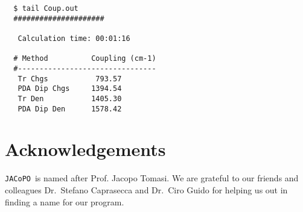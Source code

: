\documentclass[a4paper]{article}
\newcommand{\jacopo}{\texttt{JACoPO}}
\begin{document}
\begin{verbatim}
  $ tail Coup.out
  #####################

   Calculation time: 00:01:16
  
  # Method          Coupling (cm-1)
  #--------------------------------
   Tr Chgs           793.57 
   PDA Dip Chgs     1394.54 
   Tr Den           1405.30 
   PDA Dip Den      1578.42  
\end{verbatim}

\section*{Acknowledgements}
\jacopo\ is named after Prof. Jacopo Tomasi. We are grateful to our friends and colleagues Dr.~Stefano Caprasecca and Dr.~Ciro Guido for helping us out in finding a name for our program.



\end{document}
